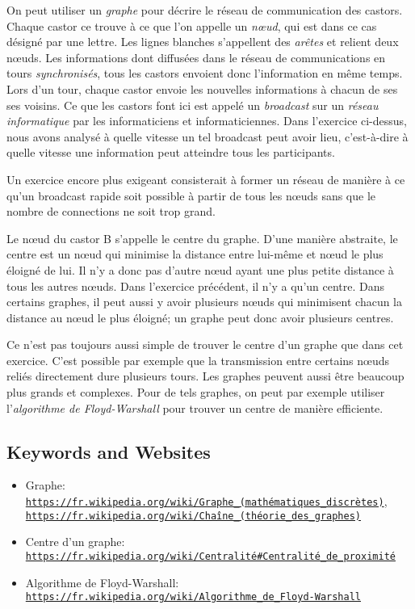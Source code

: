 \documentclass[a4paper,11pt]{report}
\newcommand{\BrochureUrlText}[1]{\texttt{#1}}
\begin{document}
On peut utiliser un \emph{graphe} pour décrire le réseau de communication des castors. Chaque castor ce trouve à ce que l’on appelle un \emph{nœud}, qui est dans ce cas désigné par une lettre. Les lignes blanches s’appellent des \emph{arêtes} et relient deux nœuds. Les informations dont diffusées dans le réseau de communications en tours \emph{synchronisés}, tous les castors envoient donc l’information en même temps. Lors d’un tour, chaque castor envoie les nouvelles informations à chacun de ses ses voisins. Ce que les castors font ici est appelé un \emph{broadcast} sur un \emph{réseau informatique} par les informaticiens et informaticiennes. Dans l’exercice ci-dessus, nous avons analysé à quelle vitesse un tel broadcast peut avoir lieu, c’est-à-dire à quelle vitesse une information peut atteindre tous les participants.

Un exercice encore plus exigeant consisterait à former un réseau de manière à ce qu’un broadcast rapide soit possible à partir de tous les nœuds sans que le nombre de connections ne soit trop grand.

Le nœud du castor B s’appelle le centre du graphe. D’une manière abstraite, le centre est un nœud qui minimise la distance entre lui-même et nœud le plus éloigné de lui. Il n’y a donc pas d’autre nœud ayant une plus petite distance à tous les autres nœuds. Dans l’exercice précédent, il n’y a qu’un centre. Dans certains graphes, il peut aussi y avoir plusieurs nœuds qui minimisent chacun la distance au nœud le plus éloigné; un graphe peut donc avoir plusieurs centres.

Ce n’est pas toujours aussi simple de trouver le centre d’un graphe que dans cet exercice. C’est possible par exemple que la transmission entre certains nœuds reliés directement dure plusieurs tours. Les graphes peuvent aussi être beaucoup plus grands et complexes. Pour de tels graphes, on peut par exemple utiliser l’\emph{algorithme de Floyd-Warshall} pour trouver un centre de manière efficiente.

{\raggedright

\subsection*{Keywords and Websites}

\begin{itemize}
  \item Graphe: \href{https://fr.wikipedia.org/wiki/Graphe_(math\%C3\%A9matiques_discr\%C3\%A8tes)}{\BrochureUrlText{https://fr.wikipedia.org/wiki/Graphe\_(mathématiques\_discrètes)}}, \href{https://fr.wikipedia.org/wiki/Cha\%C3\%AEne_(th\%C3\%A9orie_des_graphes)}{\BrochureUrlText{https://fr.wikipedia.org/wiki/Chaîne\_(théorie\_des\_graphes)}}
  \item Centre d’un graphe: \href{https://fr.wikipedia.org/wiki/Centralit\%C3\%A9\#Centralit\%C3\%A9_de_proximit\%C3\%A9}{\BrochureUrlText{https://fr.wikipedia.org/wiki/Centralité\#Centralité\_de\_proximité}}
  \item Algorithme de Floyd-Warshall: \href{https://fr.wikipedia.org/wiki/Algorithme_de_Floyd-Warshall}{\BrochureUrlText{https://fr.wikipedia.org/wiki/Algorithme\_de\_Floyd-Warshall}}
\end{itemize}


}
\end{document}
